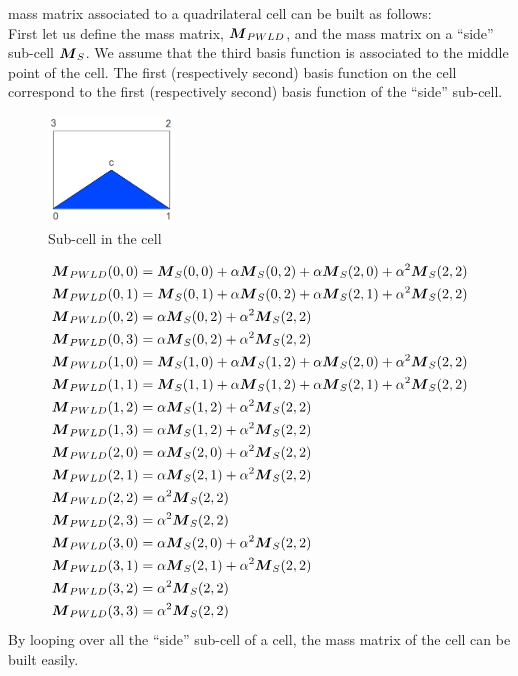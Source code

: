 mass matrix associated to a quadrilateral cell can be built as follows:\\
First let us define the mass matrix, $\boldsymbol{M}_{PWLD}$, and the mass matrix on a 
``side'' sub-cell $\boldsymbol{M}_S$. We assume that the third basis function is associated 
to the middle point of the cell. The first (respectively second) basis function on 
the cell correspond to the first (respectively second) basis function of the 
``side'' sub-cell.
\begin{figure}[H]
  \centering
  \includegraphics[width=0.3\textwidth]{mass_matrix}
  \caption{Sub-cell in the cell}
\end{figure}
{\allowdisplaybreaks
\begin{align}
  & \boldsymbol{M}_{PWLD}(0,0) =  \boldsymbol{M}_S(0,0) + \alpha \boldsymbol{M}_S(0,2) + \alpha
  \boldsymbol{M}_S(2,0) + \alpha^2 \boldsymbol{M}_S(2,2)\\
  & \boldsymbol{M}_{PWLD}(0,1) =  \boldsymbol{M}_S(0,1) + \alpha \boldsymbol{M}_S(0,2) + \alpha
  \boldsymbol{M}_S(2,1) + \alpha^2 \boldsymbol{M}_S(2,2)\\
  & \boldsymbol{M}_{PWLD}(0,2) =  \alpha \boldsymbol{M}_S(0,2) + \alpha^2 \boldsymbol{M}_S(2,2)\\
  & \boldsymbol{M}_{PWLD}(0,3) =  \alpha \boldsymbol{M}_S(0,2) + \alpha^2 \boldsymbol{M}_S(2,2)\\
  & \boldsymbol{M}_{PWLD}(1,0) =  \boldsymbol{M}_S(1,0) + \alpha \boldsymbol{M}_S(1,2) + \alpha
  \boldsymbol{M}_S(2,0) + \alpha^2 \boldsymbol{M}_S(2,2)\\
  & \boldsymbol{M}_{PWLD}(1,1) =  \boldsymbol{M}_S(1,1) + \alpha \boldsymbol{M}_S(1,2) + \alpha
  \boldsymbol{M}_S(2,1) + \alpha^2 \boldsymbol{M}_S(2,2)\\
  & \boldsymbol{M}_{PWLD}(1,2) =  \alpha \boldsymbol{M}_S(1,2) + \alpha^2 \boldsymbol{M}_S(2,2)\\
  & \boldsymbol{M}_{PWLD}(1,3) =  \alpha \boldsymbol{M}_S(1,2) + \alpha^2 \boldsymbol{M}_S(2,2)\\
  & \boldsymbol{M}_{PWLD}(2,0) =  \alpha \boldsymbol{M}_S(2,0) + \alpha^2 \boldsymbol{M}_S(2,2)\\
  & \boldsymbol{M}_{PWLD}(2,1) =  \alpha \boldsymbol{M}_S(2,1) + \alpha^2 \boldsymbol{M}_S(2,2)\\
  & \boldsymbol{M}_{PWLD}(2,2) =  \alpha^2 \boldsymbol{M}_S(2,2)\\
  & \boldsymbol{M}_{PWLD}(2,3) =  \alpha^2 \boldsymbol{M}_S(2,2)\\
  & \boldsymbol{M}_{PWLD}(3,0) =  \alpha \boldsymbol{M}_S(2,0) + \alpha^2 \boldsymbol{M}_S(2,2)\\
  & \boldsymbol{M}_{PWLD}(3,1) =  \alpha \boldsymbol{M}_S(2,1) + \alpha^2 \boldsymbol{M}_S(2,2)\\
  & \boldsymbol{M}_{PWLD}(3,2) =  \alpha^2 \boldsymbol{M}_S(2,2)\\
  & \boldsymbol{M}_{PWLD}(3,3) =  \alpha^2 \boldsymbol{M}_S(2,2)
\end{align}}    
By looping over all the ``side'' sub-cell of a cell, the mass matrix of the 
cell can be built easily.
